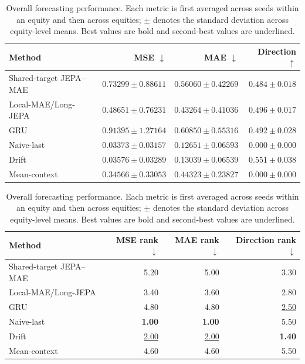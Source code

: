 \begin{table}[t]
\centering
\small
\caption{Overall forecasting performance. Each metric is first averaged across seeds within an equity and then across equities; $\pm$ denotes the standard deviation across equity-level means. Best values are bold and second-best values are underlined.}
\label{tab:main_metrics}
\begin{tabular}{lrrr}
\toprule
Method & MSE $\downarrow$ & MAE $\downarrow$ & Direction $\uparrow$ \\
\midrule
Shared-target JEPA--MAE & $0.73299 \pm 0.88611$ & $0.56060 \pm 0.42269$ & $0.484 \pm 0.018$ \\
Local-MAE/Long-JEPA & $0.48651 \pm 0.76231$ & $0.43264 \pm 0.41036$ & \underline{$0.496 \pm 0.017$} \\
GRU & $0.91395 \pm 1.27164$ & $0.60850 \pm 0.55316$ & $0.492 \pm 0.028$ \\
Naive-last & \textbf{$0.03373 \pm 0.03157$} & \textbf{$0.12651 \pm 0.06593$} & $0.000 \pm 0.000$ \\
Drift & \underline{$0.03576 \pm 0.03289$} & \underline{$0.13039 \pm 0.06539$} & \textbf{$0.551 \pm 0.038$} \\
Mean-context & $0.34566 \pm 0.33053$ & $0.44323 \pm 0.23827$ & $0.000 \pm 0.000$ \\
\bottomrule
\end{tabular}
\par\medskip
\begin{tabular}{lrrr}
\toprule
Method & MSE rank $\downarrow$ & MAE rank $\downarrow$ & Direction rank $\downarrow$ \\
\midrule
Shared-target JEPA--MAE & 5.20 & 5.00 & 3.30 \\
Local-MAE/Long-JEPA & 3.40 & 3.60 & 2.80 \\
GRU & 4.80 & 4.80 & \underline{2.50} \\
Naive-last & \textbf{1.00} & \textbf{1.00} & 5.50 \\
Drift & \underline{2.00} & \underline{2.00} & \textbf{1.40} \\
Mean-context & 4.60 & 4.60 & 5.50 \\
\bottomrule
\end{tabular}
\end{table}
